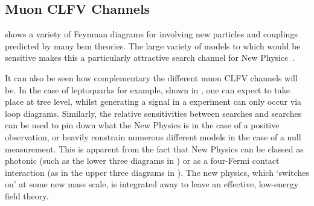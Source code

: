 
\subsection{Muon CLFV Channels}
\FigTheoryMuEConvNewPhysics
{} shows a variety of Feynman diagrams for \mueconv involving new particles and couplings predicted by many \ac{bsm} theories.
The large variety of models to which \mueconv would be sensitive makes this a particularly attractive search channel for New Physics~\cite{Altmannshofer2009ne}.

It can also be seen how complementary the different muon CLFV channels will be.
In the case of leptoquarks for example, shown in , one can expect \mueconv to take place at tree level, whilst generating a signal in a \muThreeE experiment can only occur via loop diagrams.
Similarly, the relative sensitivities between \muegamma searches and \mueconv searches can be used to pin down what the New Physics is in the case of a positive observation, or heavily constrain numerous different models in the case of a null measurement.
This is apparent from the fact that New Physics can be classed as photonic (such as the lower three diagrams in ) or as a four-Fermi contact interaction (as in the upper three diagrams in ).
The new physics, which `switches on' at some new mass scale, is integrated away to leave an effective, low-energy field theory.


